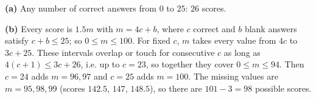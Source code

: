 \textbf{(a)} Any number of correct answers from $0$ to $25$: $\boxed{26}$ scores.

\textbf{(b)} Every score is $1.5m$ with $m=4c+b$, where $c$ correct and $b$ blank answers satisfy $c+b\le25$; so $0\le m\le100$. For fixed $c$, $m$ takes every value from $4c$ to $3c+25$. These intervals overlap or touch for consecutive $c$ as long as $4(c+1)\le3c+26$, i.e. up to $c=23$, so together they cover $0\le m\le94$. Then $c=24$ adds $m=96,97$ and $c=25$ adds $m=100$. The missing values are $m=95,98,99$ (scores $142.5$, $147$, $148.5$), so there are $101-3=\boxed{98}$ possible scores.
